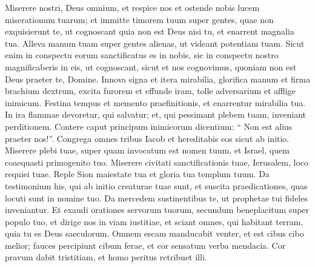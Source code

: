 \begin{biblechapter}
\begin{biblechapter}
\begin{biblechapter}
\begin{biblechapter}
\begin{biblechapter}
\begin{biblechapter}
\begin{biblechapter}
\begin{biblechapter}
\begin{biblechapter}
\begin{biblechapter}
\begin{biblechapter}
\begin{biblechapter}
\begin{biblechapter}
\begin{biblechapter}
\begin{biblechapter}
\begin{biblechapter}
\begin{biblechapter}
\begin{biblechapter}
\begin{biblechapter}
\begin{biblechapter}
\begin{biblechapter}
\begin{biblechapter}
\begin{biblechapter}
\begin{biblechapter}
\begin{biblechapter}
\begin{biblechapter}
\begin{biblechapter}
\begin{biblechapter}
\begin{biblechapter}
\begin{biblechapter}
\begin{biblechapter}
\begin{biblechapter}
\begin{biblechapter}
\begin{biblechapter}
\begin{biblechapter}
\begin{biblechapter}
\verse Miserere nostri, Deus omnium, et respice nos
 et ostende nobis lucem miserationum tuarum;
 \verse et immitte timorem tuum super gentes,
 quae non exquisierunt te,
 ut cognoscant quia non est Deus nisi tu,
 et enarrent magnalia tua.
 \verse Alleva manum tuam super gentes alienas,
 ut videant potentiam tuam.
 \verse Sicut enim in conspectu eorum sanctificatus es in nobis,
 sic in conspectu nostro magnificaberis in eis,
 \verse ut cognoscant, sicut et nos cognovimus,
 quoniam non est Deus praeter te, Domine.
 \verse Innova signa et itera mirabilia,
 \verse glorifica manum et firma brachium dextrum,
 \verse excita furorem et effunde iram,
 \verse tolle adversarium et afflige inimicum.
 \verse Festina tempus et memento praefinitionis,
 et enarrentur mirabilia tua.
 \verse In ira flammae devoretur, qui salvatur;
 et, qui pessimant plebem tuam, inveniant perditionem.
 \verse Contere caput principum inimicorum
 dicentium: “ Non est alius praeter nos!”.
 \verse Congrega omnes tribus Iacob
 et hereditabis eos sicut ab initio.
 \verse Miserere plebi tuae, super quam invocatum est nomen tuum,
 et Israel, quem coaequasti primogenito tuo.
 \verse Miserere civitati sanctificationis tuae,
 Ierusalem, loco requiei tuae.
 \verse Reple Sion maiestate tua
 et gloria tua templum tuum.
 \verse Da testimonium his, qui ab initio creaturae tuae sunt,
 et suscita praedicationes, quas locuti sunt in nomine tuo.
 \verse Da mercedem sustinentibus te,
 ut prophetae tui fideles inveniantur.
 Et exaudi orationes servorum tuorum,
 \verse secundum beneplacitum super populo tuo,
 et dirige nos in viam iustitiae,
 et sciant omnes, qui habitant terram,
 quia tu es Deus saeculorum.
 \verse Omnem escam manducabit venter,
 et est cibus cibo melior;
 \verse fauces percipiunt cibum ferae,
 et cor sensatum verba mendacia.
 \verse Cor pravum dabit tristitiam,
 et homo peritus retribuet illi.

\end{biblechapter}
\end{biblechapter}
\end{biblechapter}
\end{biblechapter}
\end{biblechapter}
\end{biblechapter}
\end{biblechapter}
\end{biblechapter}
\end{biblechapter}
\end{biblechapter}
\end{biblechapter}
\end{biblechapter}
\end{biblechapter}
\end{biblechapter}
\end{biblechapter}
\end{biblechapter}
\end{biblechapter}
\end{biblechapter}
\end{biblechapter}
\end{biblechapter}
\end{biblechapter}
\end{biblechapter}
\end{biblechapter}
\end{biblechapter}
\end{biblechapter}
\end{biblechapter}
\end{biblechapter}
\end{biblechapter}
\end{biblechapter}
\end{biblechapter}
\end{biblechapter}
\end{biblechapter}
\end{biblechapter}
\end{biblechapter}
\end{biblechapter}
\end{biblechapter}
